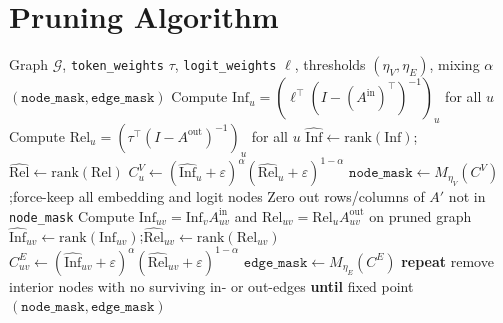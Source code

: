 \documentclass[11pt]{article}
\newcommand{\cG}{\mathcal{G}}
\begin{document}


\appendix

\section{Pruning Algorithm}
\label{sec:appendix-prune}

\begin{algorithm}[H]
\caption{Prune attribution graph (combined score)}
\label{alg:prune}
\begin{algorithmic}[1]
\Require Graph $\cG$, \texttt{token\_weights} $\tau$, \texttt{logit\_weights} $\ell$, thresholds $(\eta_V,\eta_E)$, mixing $\alpha$
\Ensure $(\texttt{node\_mask},\texttt{edge\_mask})$
\State Compute $\mathrm{Inf}_u = (\ell^\top (I-(A^{\mathrm{in}})^\top)^{-1})_u$ for all $u$
\State Compute $\mathrm{Rel}_u = (\tau^\top (I-A^{\mathrm{out}})^{-1})_u$ for all $u$
\State $\widehat{\mathrm{Inf}} \gets \mathrm{rank}(\mathrm{Inf})$;\quad $\widehat{\mathrm{Rel}} \gets \mathrm{rank}(\mathrm{Rel})$
\State $C^V_u \gets (\widehat{\mathrm{Inf}}_u+\varepsilon)^{\alpha}(\widehat{\mathrm{Rel}}_u+\varepsilon)^{1-\alpha}$
\State $\texttt{node\_mask} \gets M_{\eta_V}(C^V)$;\quad force-keep all embedding and logit nodes
\State Zero out rows/columns of $A'$ not in \texttt{node\_mask}
\State Compute $\mathrm{Inf}_{uv} = \mathrm{Inf}_v A^{\mathrm{in}}_{uv}$ and $\mathrm{Rel}_{uv} = \mathrm{Rel}_u A^{\mathrm{out}}_{uv}$ on pruned graph
\State $\widehat{\mathrm{Inf}}_{uv} \gets \mathrm{rank}(\mathrm{Inf}_{uv})$;\quad $\widehat{\mathrm{Rel}}_{uv} \gets \mathrm{rank}(\mathrm{Rel}_{uv})$
\State $C^E_{uv} \gets (\widehat{\mathrm{Inf}}_{uv}+\varepsilon)^{\alpha}(\widehat{\mathrm{Rel}}_{uv}+\varepsilon)^{1-\alpha}$
\State $\texttt{edge\_mask} \gets M_{\eta_E}(C^E)$
\State \textbf{repeat} remove interior nodes with no surviving in- or out-edges \textbf{until} fixed point
\State \Return $(\texttt{node\_mask},\texttt{edge\_mask})$
\end{algorithmic}
\end{algorithm}
\end{document}
